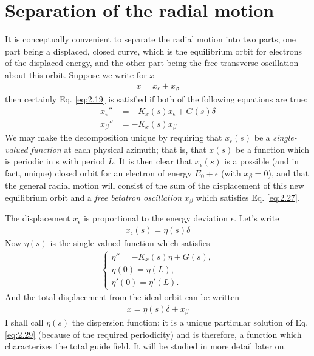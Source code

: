 \documentclass[../sands-adaptation.tex]{subfiles}
\begin{document}
\section{Separation of the radial motion} \label{sec:2.4}
It is conceptually convenient to separate the radial motion into two parts, one part being a displaced, closed curve, which is the equilibrium orbit for electrons of the displaced energy, and the other part being the free transverse oscillation about this orbit. Suppose we write for $x$
\begin{align}
	x = x_{\epsilon} + x_{\beta}\label{eq:2.25}
\end{align}
then certainly Eq. \eqref{eq:2.19} is satisfied if both of the following equations are true:
\begin{align}
	x_\epsilon'' &= -K_x(s)x_\epsilon + G(s)\delta\label{eq:2.26}\\
	x_\beta'' &= -K_x(s)x_\beta\label{eq:2.27}
\end{align}
We may make the decomposition unique by requiring that $x_\epsilon(s)$ be a \textit{single-valued function} at each physical azimuth; that is, that $x(s)$ be a function which is periodic in s with period $L$. It is then clear that $x_\epsilon(s)$ is a possible (and in fact, unique) closed orbit for an electron of energy $E_0 + \epsilon$ (with $x_\beta = 0$), and that the general radial motion will consist of the sum of the displacement of this new equilibrium orbit and a \textit{free betatron oscillation} $x_\beta$ which satisfies Eq. \eqref{eq:2.27}.

The displacement $x_\epsilon$ is proportional to the energy deviation $\epsilon$. Let’s write
\begin{align}
	x_\epsilon(s) = \eta(s)\delta\label{eq:2.28}
\end{align}
Now $\eta(s)$ is the single-valued function which satisfies
\begin{align}\label{eq:2.29}
	\begin{cases}
		\eta'' = -K_x(s)\eta + G(s), \\
        \eta(0) = \eta(L), \\
        \eta'(0) = \eta'(L).
    \end{cases}
\end{align}
And the total displacement from the ideal orbit can be written
\begin{align}
	x = \eta(s)\delta + x_\beta
\end{align}
I shall call $\eta(s)$ the dispersion function; it is a unique particular solution of Eq. \eqref{eq:2.29} (because of the required periodicity) and is therefore, a function which characterizes the total guide field. It will be studied in more detail later on.
\end{document}
